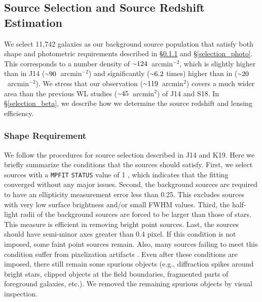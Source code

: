 \documentclass[twocolumn]{aastex631}
\newcommand{\mytilde}{\raise.19ex\hbox{$\scriptstyle\sim$}}
\newcommand{\persqarcmin}{arcmin$^{-2}$}
\newcommand{\sqarcmin}{arcmin$^{2}$}
\begin{document}
\subsection{Source Selection and Source Redshift Estimation} \label{section_source_selection}
We select 11,742 galaxies as our background source population that satisfy both shape and photometric requirements described in \S\ref{selection_shape} and \S\ref{selection_photo}. 
This corresponds to a number density of $\mytilde124$~\persqarcmin, which is slightly higher than in J14 ($\mytilde90$~\persqarcmin) and significantly ($\mytilde6.2$ times) higher than in \cite{Schrabback2018} ($\mytilde20$~\persqarcmin). 
We stress that our observation ($\mytilde119$~\sqarcmin) covers a much wider area than the previous WL studies ($\mytilde45$~\sqarcmin) of J14 and S18. 
In \S\ref{selection_beta}, we describe how we determine the source redshift and lensing efficiency.




\subsubsection{Shape Requirement} \label{selection_shape}
We follow the procedures for source selection described in J14 and K19. Here we briefly summarize the conditions that the sources should satisfy. 
First, we select sources with a {\tt MPFIT} {\tt STATUS} value of 1 \citep{MPFIT}, which indicates that the fitting converged without any major issues. 
Second, the background sources are required to have an ellipticity measurement error less than 0.25. This excludes sources with very low surface brightness and/or small FWHM values. 
Third, the half-light radii of the background sources are forced to be larger than those of stars. This measure is efficient in removing bright point sources. 
Last, the sources should have semi-minor axes greater than 0.4 pixel. If this condition is not imposed, some faint point sources remain. Also, many sources failing to meet this condition suffer from pixelization artifacts \citep{Jee2013}. 
Even after these conditions are imposed, there still remain some spurious objects (e.g., diffraction spikes around bright stars, clipped objects at the field boundaries, fragmented parts of foreground galaxies, etc.). 
We removed the remaining spurious objects by visual inspection. 
\end{document}

